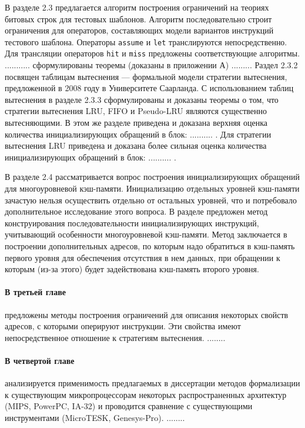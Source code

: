 \documentclass[14pt,autoref,href
,facsimile
]{disser}
\begin{document}
В разделе 2.3 предлагается алгоритм построения ограничений на теориях битовых строк для тестовых шаблонов. Алгоритм последовательно строит ограничения для операторов, составляющих модели вариантов инструкций тестового шаблона. Операторы \texttt{assume} и \texttt{let} транслируются непосредственно. Для трансляции операторов \texttt{hit} и \texttt{miss} предложены соответствующие алгоритмы. ........... сформулированы теоремы (доказаны в приложении А) ......... Раздел 2.3.2 посвящен таблицам вытеснения --- формальной модели стратегии вытеснения, предложенной в 2008 году в Университете Саарланда. С использованием таблиц вытеснения в разделе 2.3.3 сформулированы и доказаны теоремы о том, что стратегии вытеснения LRU, FIFO и Pseudo-LRU являются существенно вытесняющими. В этом же разделе приведена и доказана верхняя оценка количества инициализирующих обращений в блок: .......... . Для стратегии вытеснения LRU приведена и доказана более сильная оценка количества инициализирующих обращений в блок: .......... .

В разделе 2.4 рассматривается вопрос построения инициализирующих обращений для многоуровневой кэш-памяти. Инициализацию отдельных уровней кэш-памяти зачастую нельзя осуществить отдельно от остальных уровней, что и потребовало дополнительное исследование этого вопроса. В разделе предложен метод конструирования последовательности инициализирующих инструкций, учитывающий особенности многоуровневой кэш-памяти. Метод заключается в построении дополнительных адресов, по которым надо обратиться в кэш-память первого уровня для обеспечения отсутствия в нем данных, при обращении к которым (из-за этого) будет задействована кэш-память второго уровня.

\paragraph{В третьей главе} предложены методы построения ограничений для описания некоторых свойств адресов, с которыми оперируют инструкции. Эти свойства имеют непосредственное отношение к стратегиям вытеснения. ........

\paragraph{В четвертой главе} анализируется применимость предлагаемых в диссертации методов формализации к существующим микропроцессорам некоторых распространенных архитектур (MIPS, PowerPC, IA-32) и проводится сравнение с существующими инструментами (MicroTESK, Genesys-Pro). ........
\end{document}
